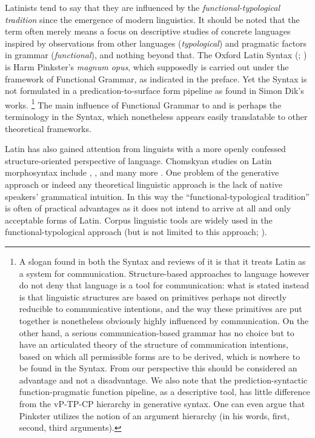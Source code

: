 \documentclass[a4paper, oneside, 12pt]{report}
\newcommand*{\term}[1]{\emph{#1}}
\newcommand{\form}[1]{\emph{#1}}
\begin{document}
Latinists tend to say that they are influenced by the \term{functional-typological tradition} since the emergence of modern linguistics.
It should be noted that the term often merely means a focus on descriptive studies of concrete languages inspired by observations from other languages (\term{typological})
and pragmatic factors in grammar (\term{functional}), and nothing beyond that.
The Oxford Latin Syntax (\citealt{Pinkster1}; \citealt{pinkster2}) is Harm Pinkster's \form{magnum opus},
which supposedly is carried out under the framework of Functional Grammar, as indicated in the preface.
Yet the Syntax is not formulated in a predication-to-surface form pipeline as found in Simon Dik's works.%
\footnote{
    A slogan found in both the Syntax and reviews of it is that it treats Latin as a system for communication.
    Structure-based approaches to language however do not deny that language is a tool for communication:
    what is stated instead is that linguistic structures are based on primitives perhaps not directly reducible to communicative intentions,
    and the way these primitives are put together is nonetheless obviously highly influenced by communication.
    On the other hand, a serious communication-based grammar has no choice but to have an articulated theory of the structure of communication intentions, based on which all permissible forms are to be derived,
    which is nowhere to be found in the Syntax.
    From our perspective this should be considered an advantage and not a disadvantage.
    We also note that the prediction-syntactic function-pragmatic function pipeline,
    as a descriptive tool, has little difference from the vP-TP-CP hierarchy in generative syntax.
    One can even argue that Pinkster utilizes the notion of an argument hierarchy (in his words, first, second, third arguments).
}
The main influence of Functional Grammar to \citet{Pinkster1} and \citet{pinkster2} is perhaps the terminology in the Syntax,
which nonetheless appears easily translatable to other theoretical frameworks.

Latin has also gained attention from linguists with a more openly confessed structure-oriented perspective of language.
Chomskyan studies on Latin morphosyntax include \citet{devine2006latin}, \citet{danckaert2015studying}, \citet{danckaert2017development,oniga2014latin} and many more \citep{mateu2017latin}. 
One problem of the generative approach or indeed any theoretical linguistic approach is the lack of native speakers' grammatical intuition.
In this way the ``functional-typological tradition'' is often of practical advantages as it does not intend to arrive at all and only acceptable forms of Latin.
Corpus linguistic tools are widely used in the functional-typological approach
(but is not limited to this approach; \citealt{danckaert2015studying}).
\end{document}
